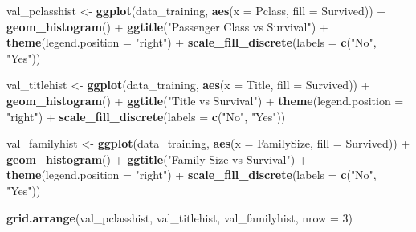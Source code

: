 \documentclass[]{article}
\newenvironment{Shaded}{\begin{snugshade}}{\end{snugshade}}
\newcommand{\KeywordTok}[1]{\textcolor[rgb]{0.13,0.29,0.53}{\textbf{{#1}}}}
\newcommand{\DataTypeTok}[1]{\textcolor[rgb]{0.13,0.29,0.53}{{#1}}}
\newcommand{\DecValTok}[1]{\textcolor[rgb]{0.00,0.00,0.81}{{#1}}}
\newcommand{\StringTok}[1]{\textcolor[rgb]{0.31,0.60,0.02}{{#1}}}
\newcommand{\NormalTok}[1]{{#1}}
\begin{document}
\begin{Shaded}
\begin{Highlighting}[]
\NormalTok{val_pclasshist <-}\StringTok{ }\KeywordTok{ggplot}\NormalTok{(data_training, }\KeywordTok{aes}\NormalTok{(}\DataTypeTok{x =} \NormalTok{Pclass, }\DataTypeTok{fill =} \NormalTok{Survived)) +}
\StringTok{                        }\KeywordTok{geom_histogram}\NormalTok{() +}
\StringTok{                        }\KeywordTok{ggtitle}\NormalTok{(}\StringTok{"Passenger Class vs Survival"}\NormalTok{) +}
\StringTok{                        }\KeywordTok{theme}\NormalTok{(}\DataTypeTok{legend.position =} \StringTok{"right"}\NormalTok{) +}
\StringTok{                        }\KeywordTok{scale_fill_discrete}\NormalTok{(}\DataTypeTok{labels =} \KeywordTok{c}\NormalTok{(}\StringTok{"No"}\NormalTok{, }\StringTok{"Yes"}\NormalTok{))}

\NormalTok{val_titlehist <-}\StringTok{ }\KeywordTok{ggplot}\NormalTok{(data_training, }\KeywordTok{aes}\NormalTok{(}\DataTypeTok{x =} \NormalTok{Title, }\DataTypeTok{fill =} \NormalTok{Survived)) +}
\StringTok{                        }\KeywordTok{geom_histogram}\NormalTok{() +}
\StringTok{                        }\KeywordTok{ggtitle}\NormalTok{(}\StringTok{"Title vs Survival"}\NormalTok{) +}
\StringTok{                        }\KeywordTok{theme}\NormalTok{(}\DataTypeTok{legend.position =} \StringTok{"right"}\NormalTok{) +}
\StringTok{                        }\KeywordTok{scale_fill_discrete}\NormalTok{(}\DataTypeTok{labels =} \KeywordTok{c}\NormalTok{(}\StringTok{"No"}\NormalTok{, }\StringTok{"Yes"}\NormalTok{))}

\NormalTok{val_familyhist <-}\StringTok{ }\KeywordTok{ggplot}\NormalTok{(data_training, }\KeywordTok{aes}\NormalTok{(}\DataTypeTok{x =} \NormalTok{FamilySize, }\DataTypeTok{fill =} \NormalTok{Survived)) +}
\StringTok{                        }\KeywordTok{geom_histogram}\NormalTok{() +}
\StringTok{                        }\KeywordTok{ggtitle}\NormalTok{(}\StringTok{"Family Size vs Survival"}\NormalTok{) +}
\StringTok{                        }\KeywordTok{theme}\NormalTok{(}\DataTypeTok{legend.position =} \StringTok{"right"}\NormalTok{) +}
\StringTok{                        }\KeywordTok{scale_fill_discrete}\NormalTok{(}\DataTypeTok{labels =} \KeywordTok{c}\NormalTok{(}\StringTok{"No"}\NormalTok{, }\StringTok{"Yes"}\NormalTok{))}

\KeywordTok{grid.arrange}\NormalTok{(val_pclasshist, val_titlehist, val_familyhist, }\DataTypeTok{nrow =} \DecValTok{3}\NormalTok{)}
\end{Highlighting}
\end{Shaded}
\end{document}

